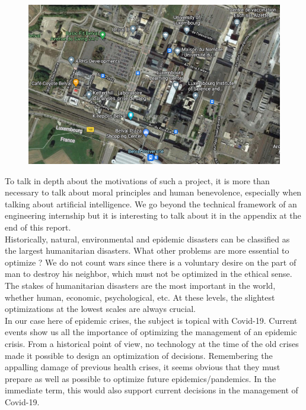 \begin{figure}[h]
  \centering
  \includegraphics[width=0.8\linewidth]{Media/BelvalMaps.png}
  \caption{}
  \label{fig:belvalmaps}
\end{figure}

To talk in depth about the motivations of such a project, it is more than necessary to talk about moral principles and human benevolence, especially when talking about artificial intelligence. We go beyond the technical framework of an engineering internship but it is interesting to talk about it in the appendix at the end of this report. \\

Historically, natural, environmental and epidemic disasters can be classified as the largest humanitarian disasters. What other problems are more essential to optimize ? We do not count wars since there is a voluntary desire on the part of man to destroy his neighbor, which must not be optimized in the ethical sense. The stakes of humanitarian disasters are the most important in the world, whether human, economic, psychological, etc. At these levels, the slightest optimizations at the lowest scales are always crucial.\\

In our case here of epidemic crises, the subject is topical with Covid-19. Current events show us all the importance of optimizing the management of an epidemic crisis. From a historical point of view, no technology at the time of the old crises made it possible to design an optimization of decisions. Remembering the appalling damage of previous health crises, it seems obvious that they must prepare as well as possible to optimize future epidemics/pandemics. In the immediate term, this would also support current decisions in the management of Covid-19.\\

